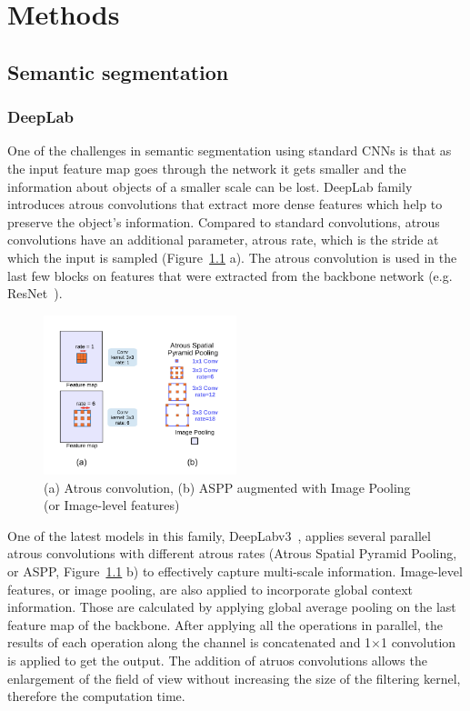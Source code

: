\chapter{Methods}
\section{Semantic segmentation}
\subsection{DeepLab}
One of the challenges in semantic segmentation using standard CNNs is that as the input feature map goes through the network
it gets smaller and the information about objects of a smaller scale can be lost.
DeepLab family introduces atrous convolutions that extract more dense features
which help to preserve the object's information. Compared to standard convolutions, atrous convolutions have an additional parameter, atrous
rate, which is the stride at which the input is sampled (Figure~\ref*{fig:aconv} a).
The atrous convolution is used in the last few blocks on features that were extracted from the backbone network (e.g. ResNet~\cite{he2016deep}).

\begin{figure}
  \centering
  \includegraphics[width=0.5\textwidth]{figures/conv_aspp.png} %
  \caption{(a) Atrous convolution, (b) ASPP augmented with Image Pooling (or Image-level features) ~\cite{chen2017rethinking}} %
  \label{fig:aconv} %
\end{figure}
One of the latest models in this family, DeepLabv3~\cite{chen2017rethinking}, applies several parallel atrous convolutions with different atrous rates
(Atrous Spatial Pyramid Pooling, or ASPP, Figure~\ref*{fig:aconv} b) to effectively capture multi-scale information. 
Image-level features, or image pooling, are also applied to incorporate global context information. Those are calculated by applying global average pooling on the last feature map of the backbone.
After applying all the operations in parallel, the results of each operation along the channel is concatenated and 1$\times$1 convolution is applied to get the output.
The addition of atruos convolutions allows the enlargement of the field of view without
increasing the size of the filtering kernel, therefore the computation time.
